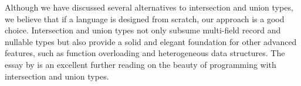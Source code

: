 Although we have discussed several alternatives to intersection and union types,
we believe that if a language is designed from scratch, our approach is a good
choice. Intersection and union types not only subsume multi-field record and
nullable types but also provide a solid and elegant foundation for other
advanced features, such as function overloading and heterogeneous data
structures. The essay by \citet{castagna2023programming} is an excellent further
reading on the beauty of programming with intersection and union types.
